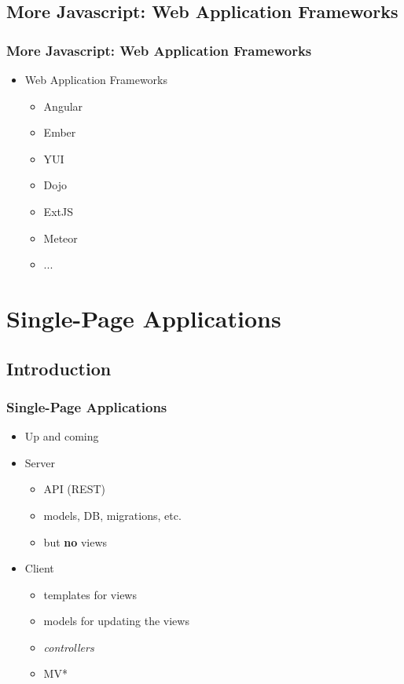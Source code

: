 \documentclass{beamer}
\begin{document}
\subsection{More Javascript: Web Application Frameworks} 
\begin{frame}[fragile]\frametitle{More Javascript: Web Application Frameworks} 

  \begin{itemize}
    \item Web Application Frameworks
    \begin{itemize}
      \item Angular
      \item Ember
      \item YUI
      \item Dojo
      \item ExtJS
      \item Meteor
      \item ...
    \end{itemize}
  \end{itemize}

\end{frame}




\section{Single-Page Applications} 
\subsection{Introduction}
\begin{frame}[fragile]\frametitle{Single-Page Applications} 

  \begin{itemize}
    \item Up and coming
    \item Server
    \begin{itemize}
      \item API (REST)
      \item models, DB, migrations, etc.
      \item but \textbf{no} views
    \end{itemize}
    \item Client
    \begin{itemize}
      \item templates for views
      \item models for updating the views
      \item \textit{controllers}
      \item MV*
    \end{itemize}
    
  \end{itemize}

\end{frame}
\end{document}

